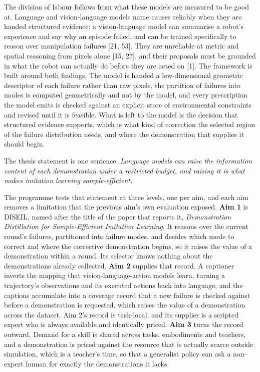 \documentclass[
  11pt,
]{article}
\begin{document}
The division of labour follows from what these models are measured to be
good at. Language and vision-language models name causes reliably when
they are handed structured evidence: a vision-language model can
summarise a robot's experience and say why an episode failed, and can be
trained specifically to reason over manipulation failures {[}21, 53{]}.
They are unreliable at metric and spatial reasoning from pixels alone
{[}15, 27{]}, and their proposals must be grounded in what the robot can
actually do before they are acted on {[}1{]}. The framework is built
around both findings. The model is handed a low-dimensional geometric
descriptor of each failure rather than raw pixels, the partition of
failures into modes is computed geometrically and not by the model, and
every prescription the model emits is checked against an explicit store
of environmental constraints and revised until it is feasible. What is
left to the model is the decision that structured evidence supports,
which is what kind of correction the selected region of the failure
distribution needs, and where the demonstration that supplies it should
begin.

The thesis statement is one sentence. \emph{Language models can raise
the information content of each demonstration under a restricted budget,
and raising it is what makes imitation learning sample-efficient.}

The programme tests that statement at three levels, one per aim, and
each aim removes a limitation that the previous aim's own evaluation
exposed. \textbf{Aim 1} is DISEIL, named after the title of the paper
that reports it, \emph{Demonstration Distillation for Sample-Efficient
Imitation Learning}. It reasons over the current round's failures,
partitioned into failure modes, and decides which mode to correct and
where the corrective demonstration begins, so it raises the value of a
demonstration within a round. Its selector knows nothing about the
demonstrations already collected. \textbf{Aim 2} supplies that record. A
captioner inverts the mapping that vision-language-action models learn,
turning a trajectory's observations and its executed actions back into
language, and the captions accumulate into a coverage record that a new
failure is checked against before a demonstration is requested, which
raises the value of a demonstration across the dataset. Aim 2's record
is task-local, and its supplier is a scripted expert who is always
available and identically priced. \textbf{Aim 3} turns the record
outward. Demand for a skill is shared across tasks, embodiments and
teachers, and a demonstration is priced against the resource that is
actually scarce outside simulation, which is a teacher's time, so that a
generalist policy can ask a non-expert human for exactly the
demonstrations it lacks.
\end{document}
